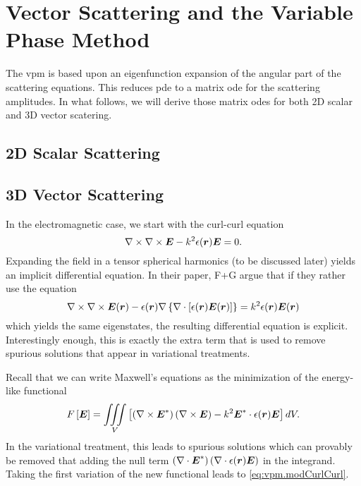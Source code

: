 \section{Vector Scattering and the Variable Phase Method}
The \gls{vpm} is based upon an eigenfunction expansion of the 
angular part of the scattering equations. This reduces \gls{pde}
to a matrix \gls{ode} for the scattering amplitudes. In what
follows, we will derive those matrix \glspl{ode} for both 
2D scalar and 3D vector scatering. 

\subsection{2D Scalar Scattering}

\subsection{3D Vector Scattering}
In the electromagnetic case, we start with the curl-curl equation
  \begin{equation}
    \nabla\times\nabla\times\boldsymbol{E}-k^2\epsilon(\boldsymbol{r})\boldsymbol{E}=0.
  \end{equation}
Expanding the field in a tensor spherical harmonics (to be discussed later) yields
an implicit differential equation. In their paper, F+G argue that if they rather
use the equation
  \begin{equation}
   \label{eq:vpm.modCurlCurl}
   \nabla\times\nabla\times\boldsymbol{E}(\boldsymbol{r})-\epsilon(\boldsymbol{r})\nabla\left\{\nabla\cdot\left[\epsilon(\boldsymbol{r})\boldsymbol{E}(\boldsymbol{r})\right]\right\}
      =k^2\epsilon(\boldsymbol{r})\boldsymbol{E}(\boldsymbol{r})
  \end{equation}
which yields the same eigenstates, the resulting differential equation is explicit. 
Interestingly enough, this is exactly the extra term that is used to remove
spurious solutions that appear in variational treatments. 

Recall that we can write Maxwell's equations as the minimization of the energy-like functional
  \begin{equation}
   F\left[\boldsymbol{E}\right]=\mathop{\iiint}_V\left[\left(\nabla\times\boldsymbol{E}^*\right)\left(\nabla\times\boldsymbol{E}\right)-k^2\boldsymbol{E}^*\cdot\epsilon(\boldsymbol{r})\boldsymbol{E}\right]dV.
  \end{equation}
In the variational treatment, this leads to spurious solutions which can provably be removed \cite{KON1976,KOS1984,KOS1985} that adding the null term
$\left(\nabla\cdot\boldsymbol{E}^*\right)\left(\nabla\cdot\epsilon(\boldsymbol{r})\boldsymbol{E}\right)$ in the integrand. 
Taking the first variation of the new functional leads to \eqref{eq:vpm.modCurlCurl}.
  
